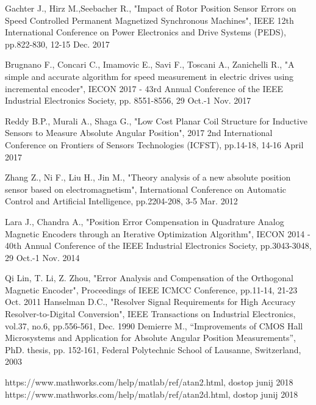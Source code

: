 \documentclass[a4paper]{article}
\begin{document}
\small
\begin{thebibliography}{1}
 Gachter J., Hirz M.,Seebacher R., "Impact of Rotor Position Sensor Errors on Speed
Controlled Permanent Magnetized Synchronous
Machines", IEEE 12th International Conference on Power Electronics and Drive Systems (PEDS), pp.822-830, 12-15 Dec. 2017

 Brugnano F., Concari C., Imamovic E., Savi F., Toscani  A., Zanichelli R., "A simple and accurate algorithm for speed measurement in electric drives using incremental encoder",
IECON 2017 - 43rd Annual Conference of the IEEE Industrial Electronics Society, pp. 8551-8556, 29 Oct.-1 Nov. 2017


 Reddy B.P., Murali A., Shaga G., "Low Cost Planar Coil Structure for Inductive Sensors to Measure Absolute Angular
Position", 2017 2nd International Conference on Frontiers of Sensors Technologies (ICFST), pp.14-18, 14-16 April 2017




 Zhang Z., Ni F., Liu H., Jin M., "Theory analysis of a new absolute position sensor based on electromagnetism", International Conference on Automatic Control and Artificial Intelligence, pp.2204-208, 3-5 Mar. 2012

 Lara J., Chandra A., "Position Error Compensation in Quadrature
Analog Magnetic Encoders through an Iterative
Optimization Algorithm",  IECON 2014 - 40th Annual Conference of the IEEE Industrial Electronics Society, pp.3043-3048, 29 Oct.-1 Nov. 2014 
	
 Qi Lin, T. Li, Z. Zhou, "Error Analysis and Compensation
of the Orthogonal Magnetic Encoder", Proceedings of IEEE ICMCC
Conference, pp.11-14, 21-23 Oct. 2011
 Hanselman D.C., "Resolver Signal Requirements for High Accuracy
Resolver-to-Digital Conversion", IEEE Transactions on Industrial
Electronics, vol.37, no.6, pp.556-561, Dec. 1990 
 Demierre M., “Improvements of CMOS Hall Microsystems and
Application for Absolute Angular Position Measurements”, PhD. thesis,
pp. 152-161, Federal Polytechnic School of Lausanne, Switzerland, 2003


 https://www.mathworks.com/help/matlab/ref/atan2.html, dostop junij 2018
 https://www.mathworks.com/help/matlab/ref/atan2d.html, dostop junij 2018



\end{thebibliography}
\end{document}
